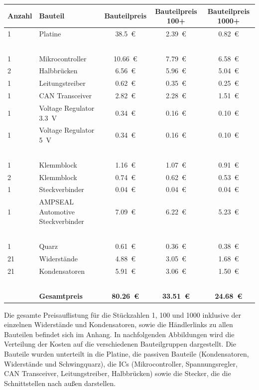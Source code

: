 \begin{table}[h]
	\centering
\begin{tabular}{ l   l   c   c   c }
	Anzahl & Bauteil & Bauteilpreis & Bauteilpreis 100+ & Bauteilpreis 1000+\\ \hline
	1 & Platine & \SI{38,5}{\euro} & \SI{2,39}{\euro} & \SI{0,82}{\euro}\\
	\  & \  & \  & \  & \  \\
	1 & Mikrocontroller & \SI{10,66}{\euro} & \SI{7,79}{\euro} & \SI{6,58}{\euro} \\
	2 & Halbbrücken & \SI{6,56}{\euro} & \SI{5,96}{\euro} & \SI{5,04}{\euro}\\
	1 & Leitungstreiber & \SI{0,62}{\euro} & \SI{0,35}{\euro} & \SI{0,25}{\euro} \\
	1 & CAN Transceiver & \SI{2,82}{\euro} & \SI{2,28}{\euro} & \SI{1,51}{\euro} \\
	1 & Voltage Regulator \SI{3,3}{V} & \SI{0,34}{\euro} & \SI{0,16}{\euro} & \SI{0,10}{\euro} \\
	1 & Voltage Regulator \SI{5}{V}& \SI{0,34}{\euro} & \SI{0,16}{\euro} & \SI{0,10}{\euro} \\
	\  & \  & \  & \  & \  \\
	1 & Klemmblock & \SI{1,16}{\euro} & \SI{1,07}{\euro} & \SI{0,91}{\euro} \\
	2 & Klemmblock & \SI{0,74}{\euro} & \SI{0,62}{\euro} & \SI{0,53}{\euro} \\
	1 & Steckverbinder & \SI{0,04}{\euro} & \SI{0,04}{\euro} & \SI{0,04}{\euro} \\
	1 & AMPSEAL Automotive Steckverbinder & \SI{7,09}{\euro} & \SI{6,22}{\euro} & \SI{5,23}{\euro}\\
	\  & \  & \  & \  & \  \\
	1 & Quarz & \SI{0,61}{\euro} & \SI{0,36}{\euro} & \SI{0,38}{\euro} \\
	21 & Widerstände & \SI{4,88}{\euro} & \SI{3,05}{\euro} & \SI{1,68}{\euro}\\
	21 & Kondensatoren & \SI{5,91}{\euro} & \SI{3,06}{\euro} & \SI{1,50}{\euro}\\
	\  & \  & \  & \  & \  \\
	\  & \textbf{Gesamtpreis} & \textbf{\SI{80,26}{\euro}}  & \textbf{\SI{33,51}{\euro}}  & \textbf{\SI{24,68}{\euro}}  \\
\end{tabular}
	\label{tab:Preisliste}
\end{table}\noindent
Die gesamte Preisauflistung für die Stückzahlen 1, 100 und 1000 inklusive der einzelnen Widerstände und Kondensatoren, sowie die Händlerlinks zu allen Bauteilen befindet sich im Anhang.
In nachfolgenden Abbildungen wird die Verteilung der Kosten auf die verschiedenen Bauteilgruppen dargestellt. Die Bauteile wurden unterteilt in die Platine, die passiven Bauteile (Kondensatoren, Widerstände und Schwingquarz), die ICs (Mikrocontroller, Spannungsregler, CAN Transceiver, Leitungstreiber, Halbbrücken) sowie die Stecker, die die Schnittstellen nach außen darstellen. 

